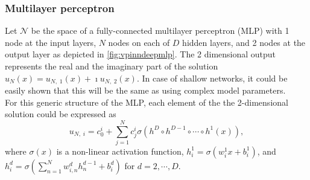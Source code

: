 \subsubsection{Multilayer perceptron}\label{sec:vpinnsmlp}
Let $\mathcal{N}$ be the space of a fully-connected multilayer perceptron (MLP) with 1 node at the input layers, $N$ nodes on each of $D$ hidden layers, and 2 nodes at the output layer as depicted in \autoref{fig:vpinndeepmlp}. The 2 dimensional output represents the real and the imaginary part of the solution $u_N(x) = u_{N,\;1}(x) + \imath u_{N,\;2}(x)$. In case of shallow networks, it could be easily shown that this will be the same as using complex model parameters.\\
For this generic structure of the MLP, each element of the the 2-dimensional solution could be expressed as
\begin{equation}
    \label{eq:vpinngeneric}
    u_{N,\;i} = c_0^i + \sum_{j=1}^{N}{c_j^i \sigma(h^{D} \circ h^{D-1} \circ \cdots \circ h^1(x))},
\end{equation}
where $\sigma (x)$ is a non-linear activation function, $h^1_i = \sigma(w^1_i x + b^1_i)$, and
$h^d_i = \sigma(\sum_{n=1}^{N}{w^d_{i, n} h^{d-1}_n} + b^d_i)$ for $d = 2, \cdots, D$.
